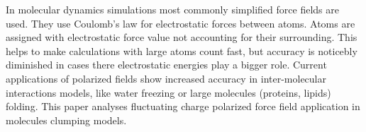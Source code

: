 In molecular dynamics simulations most commonly simplified force fields are used.
They use Coulomb's law for electrostatic forces between atoms. Atoms are assigned with electrostatic force value not accounting for their surrounding.
This helps to make calculations with large atoms count fast, but accuracy is noticebly diminished in cases there electrostatic energies play a bigger role.
Current applications of polarized fields show increased accuracy in inter-molecular interactions models, like water freezing or large molecules (proteins, lipids) folding.
This paper analyses fluctuating charge polarized force field application in molecules clumping models.
